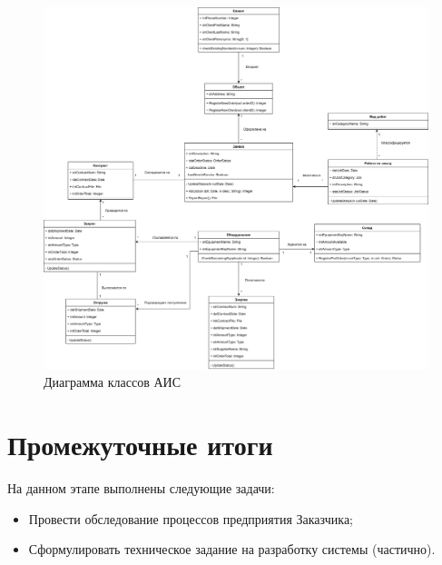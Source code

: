 \documentclass[a4paper,12pt]{article}
\begin{document}
\begin{figure}[H]
    \centering
    \includegraphics[width=\linewidth]{classes.png}
    \caption{Диаграмма классов АИС}
    \label{fig:classes}
\end{figure}










\newpage
\section*{Промежуточные итоги}

На данном этапе выполнены следующие задачи:
\begin{itemize}
    \item Провести обследование процессов предприятия Заказчика;
    \item Сформулировать техническое задание на разработку системы (частично).
\end{itemize}
\end{document}
